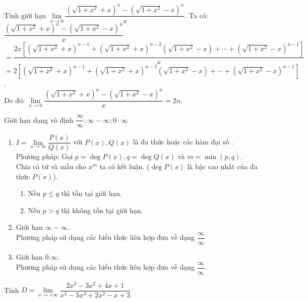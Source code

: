 \begin{bt}%
Tính giới hạn $\lim\limits_{x \to 0}\dfrac{(\sqrt{1+x^2}+x)^n - (\sqrt{1+x^2}-x)^n}{x}$.
\loigiai
{
Ta có:\\ 
$\dfrac{(\sqrt{1+x^2}+x)^n - (\sqrt{1+x^2}-x)^n}{x} $\\
$= \dfrac{2x\left[\left(\sqrt{1+x^2}+x\right)^{n-1}+\left(\sqrt{1+x^2}+x\right)^{n-2}\left(\sqrt{1+x^2}-x\right)+\cdots + \left(\sqrt{1+x^2}-x\right)^{n-1}\right]}{x}$\\
$= 2\left[\left(\sqrt{1+x^2}+x\right)^{n-1}+\left(\sqrt{1+x^2}+x\right)^{n-2}\left(\sqrt{1+x^2}-x\right)+\cdots + \left(\sqrt{1+x^2}-x\right)^{n-1}\right]$.\\
Do đó: $\lim\limits_{x \to 0}\dfrac{(\sqrt{1+x^2}+x)^n - (\sqrt{1+x^2}-x)^n}{x} = 2n$.
}
\end{bt}

\begin{dang}{Giới hạn dạng vô định $\dfrac{\infty }{\infty };\infty -\infty ;0\cdot\infty$}
\begin{enumerate}[Dạng 1:]
\item $I=\lim\limits_{x\to \infty}\dfrac{P(x)}{Q(x)}$ với $P(x),Q(x)$ là đa thức hoặc các hàm đại số .\\
Phương pháp: Gọi $p=\deg P(x),q=\deg Q(x)$ và $m=\min(p,q)$. Chia cả tử và mẫu cho $x^m$ ta có kết luận. ($\deg P(x)$ là bậc cao nhất của đa thức $P(x)$).
\begin{enumerate}[+]
\item Nếu $p\leq q$ thì tồn tại giới hạn.
\item Nếu $p>q$ thì không tồn tại giới hạn.
\end{enumerate}
\item Giới hạn $\infty -\infty$.\\
Phương pháp sử dụng các biểu thức liên hợp đưa về dạng $\dfrac{\infty}{\infty}$
\item Giới hạn $0.\infty $.\\
Phương pháp sử dụng các biểu thức liên hợp đưa về dạng $\dfrac{\infty }{\infty }$.
\end{enumerate}
\end{dang}

\begin{vd}%
Tính $D=\lim\limits_{x\to +\infty}\dfrac{2x^3-3x^2+4x+1}{x^4-5x^3+2x^2-x+3}$
\end{vd}

